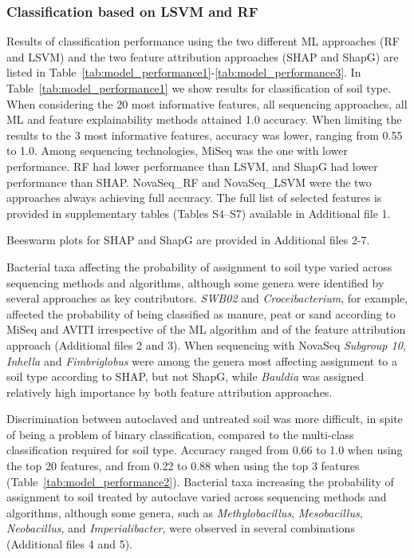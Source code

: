 \documentclass[12pt]{article}
\theoremstyle{thmstyleone}%
\theoremstyle{thmstyletwo}%
\theoremstyle{thmstylethree}%
\begin{document}
\subsubsection{Classification based on LSVM and RF}

Results of classification performance using the two different ML approaches (RF and LSVM) and the two feature attribution approaches (SHAP and ShapG) are listed in Table~\ref{tab:model_performance1}-\ref{tab:model_performance3}. In Table~\ref{tab:model_performance1} we show results for classification of soil type. When considering the 20 most informative features, all sequencing approaches, all ML and feature explainability methods attained 1.0 accuracy. When limiting the results to the 3 most informative features, accuracy was lower, ranging from 0.55 to 1.0. Among sequencing technologies, MiSeq was the one with lower performance. RF had lower performance than LSVM, and ShapG had lower performance than SHAP. NovaSeq\_RF and NovaSeq\_LSVM were the two approaches always achieving full accuracy. The full list of selected features is provided in supplementary tables (Tables S4–S7) available in Additional file 1.

Beeswarm plots for SHAP and ShapG are provided in Additional files 2-7.

Bacterial taxa affecting the probability of assignment to soil type varied across sequencing methods and algorithms, although some genera were identified by several approaches as key contributors. \textit{SWB02} and \textit{Croceibacterium}, for example, affected the probability of being classified as manure, peat or sand according to MiSeq and AVITI irrespective of the ML algorithm and of the feature attribution approach (Additional files 2 and 3). When sequencing with NovaSeq \textit{Subgroup 10}, \textit{Inhella} and \textit{Fimbriglobus} were among the genera most affecting assignment to a soil type according to SHAP, but not ShapG, while \textit{Bauldia} was assigned relatively high importance by both feature attribution approaches. 

Discrimination between autoclaved and untreated soil was more difficult, in spite of being a problem of binary classification, compared to the multi-class classification required for soil type. Accuracy ranged from 0.66 to 1.0 when using the top 20 features, and from 0.22 to 0.88 when using the top 3 features (Table~\ref{tab:model_performance2}). 
Bacterial taxa increasing the probability of assignment to soil treated by autoclave varied across sequencing methods and algorithms, although some genera, such as \textit{Methylobacillus}, \textit{Mesobacillus}, \textit{Neobacillus}, and \textit{Imperialibacter}, were observed in several combinations (Additional files 4 and 5). 
\end{document}
